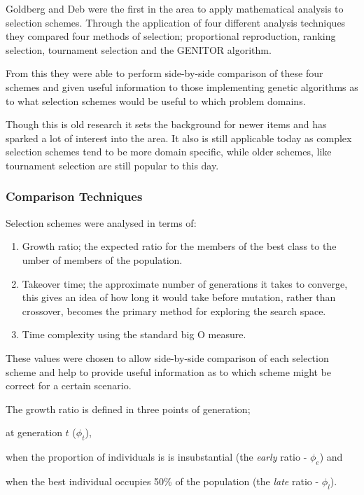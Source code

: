 \documentclass[10pt, a4paper]{article}
\begin{document}
Goldberg and Deb\cite{Goldberg1991Comparative} were the first in the area to
apply mathematical analysis to selection schemes. Through the application of
four different analysis techniques they compared four methods of  selection; 
proportional reproduction, ranking selection, tournament selection and the 
GENITOR algorithm\cite{Whitley1989GENITOR}.

From this they were able to perform side-by-side comparison of these four
schemes and given useful information to those implementing genetic algorithms as
to what selection schemes would be useful to which problem domains.

Though this is old research it sets the background for newer items and has
sparked a lot of interest into the area. It also is still applicable today as
complex selection schemes tend to be more domain specific, while older schemes,
like tournament selection are still popular to this day.

\subsubsection{Comparison Techniques} 
Selection schemes were analysed in terms of:

\begin{enumerate}
\item Growth ratio; the expected ratio for the members of the best class to the
umber of members of the population.
\item Takeover time; the approximate number of generations it takes
to converge, this gives an idea of how long it would take before mutation,
rather than crossover, becomes the primary method for exploring the search
space. 
\item Time complexity using the standard big O measure.
\end{enumerate}

These values were chosen to allow side-by-side comparison of each selection
scheme and help to provide useful information as to which scheme might be
correct for a certain scenario.

The growth ratio is defined in three points of generation;
\begin{inparaenum}[1\upshape)]
\item at generation $t$ ($\phi_t$),
\item when the proportion of individuals is is insubstantial (the \textit{early}
      ratio - $\phi_e$) and
\item when the best individual occupies 50\% of the population (the
      \textit{late} ratio - $\phi_l$).
\end{inparaenum}
\end{document}
